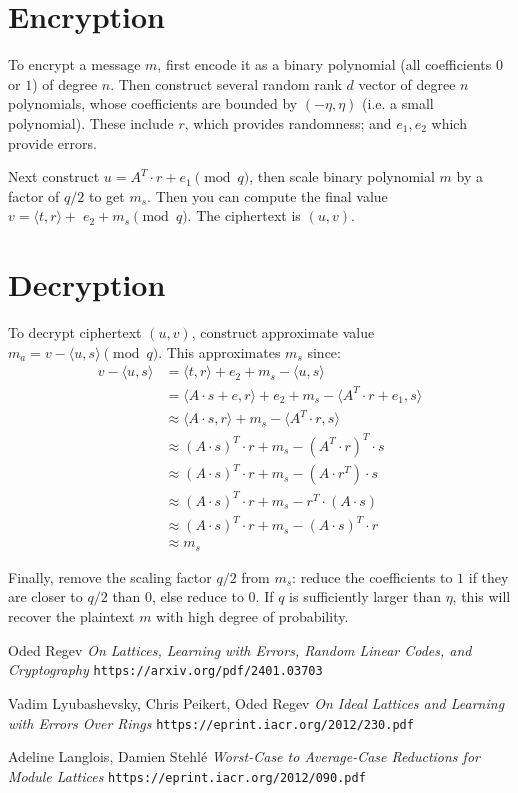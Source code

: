\documentclass{article}
\begin{document}
\newpage
\section{
  Encryption
}

To encrypt a message $m$, first encode it as a binary polynomial (all coefficients $0$ or $1$) of degree $n$.  Then construct several random rank $d$ vector of degree $n$ polynomials, whose coefficients are bounded by $(-\eta, \eta)$ (i.e. a small polynomial).  These include $r$, which provides randomness; and $e_1, e_2$ which provide errors.

Next construct $u = A^T \cdot r + e_1 \pmod{q}$, then scale binary polynomial $m$ by a factor of $q/2$ to get $m_s$.  Then you can compute the final value $v = \langle t, r \rangle +\;e_2 + m_s \pmod{q}$.  The ciphertext is $(u, v)$.

\section{
  Decryption
}

To decrypt ciphertext $(u, v)$, construct approximate value $m_a = v - \langle u, s \rangle \pmod{q}$.  This approximates $m_s$ since:
\begin{align}
  v - \langle u, s \rangle &= \langle t, r \rangle + e_2 + m_s - \langle u, s \rangle\nonumber\\
  &= \langle A \cdot s + e, r \rangle + e_2 + m_s - \langle A^T \cdot r + e_1, s \rangle\nonumber\\
  &\approx \langle A \cdot s, r \rangle + m_s - \langle A^T \cdot r, s \rangle\nonumber\\
  &\approx (A \cdot s)^T \cdot r + m_s - (A^T \cdot r)^T \cdot s\nonumber\\
  &\approx (A \cdot s)^T \cdot r + m_s - (A \cdot r^T) \cdot s\nonumber\\
  &\approx (A \cdot s)^T \cdot r + m_s - r^T \cdot (A \cdot s)\nonumber\\
  &\approx (A \cdot s)^T \cdot r + m_s - (A \cdot s)^T \cdot r\nonumber\\
  &\approx m_s
\end{align}

Finally, remove the scaling factor $q/2$ from $m_s$: reduce the coefficients to $1$ if they are closer to $q/2$ than $0$, else reduce to $0$.  If $q$ is sufficiently larger than $\eta$, this will recover the plaintext $m$ with high degree of probability.


\begin{thebibliography}{3}

  Oded Regev
  \emph{On Lattices, Learning with Errors, Random Linear Codes, and Cryptography}
  \texttt{https://arxiv.org/pdf/2401.03703}

  Vadim Lyubashevsky, Chris Peikert, Oded Regev
  \emph{On Ideal Lattices and Learning with Errors Over Rings}
  \texttt{https://eprint.iacr.org/2012/230.pdf}

  Adeline Langlois, Damien Stehlé
  \emph{Worst-Case to Average-Case Reductions for Module Lattices}
  \texttt{https://eprint.iacr.org/2012/090.pdf}
  
\end{thebibliography}
\end{document}
